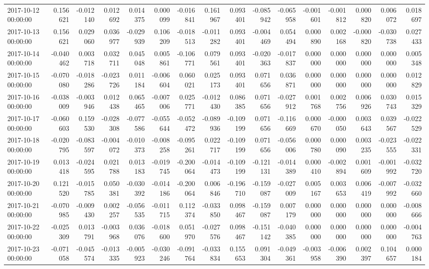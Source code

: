 \begin{tabular}{lrrrrrrrrrrrrrrr}
2017-10-12 00:00:00 & 0.156621 & -0.012140 & 0.012692 & 0.014375 & 0.000099 & -0.016841 & 0.161967 & 0.093401 & -0.085942 & -0.065958 & -0.001601 & -0.001812 & 0.000820 & 0.006072 & 0.018697 \\
2017-10-13 00:00:00 & 0.156621 & 0.029060 & 0.036977 & -0.029939 & 0.106209 & -0.018513 & -0.011282 & 0.093401 & -0.004469 & 0.054494 & 0.000890 & 0.002168 & -0.000820 & -0.030738 & 0.027433 \\
2017-10-14 00:00:00 & -0.040462 & 0.003718 & 0.032711 & 0.045048 & 0.005861 & -0.106771 & 0.079561 & 0.093401 & -0.020363 & -0.017837 & 0.000000 & 0.000000 & 0.000000 & 0.000000 & 0.005348 \\
2017-10-15 00:00:00 & -0.070080 & -0.018286 & -0.023726 & 0.011184 & -0.006604 & 0.060021 & 0.025173 & 0.093401 & 0.071656 & 0.036871 & 0.000000 & 0.000000 & 0.000000 & 0.000000 & 0.012829 \\
2017-10-16 00:00:00 & -0.038009 & -0.003946 & 0.012438 & 0.065465 & -0.007006 & 0.025771 & -0.012430 & 0.086385 & 0.071656 & -0.027912 & 0.001768 & 0.002756 & 0.006926 & 0.030743 & 0.015329 \\
2017-10-17 00:00:00 & -0.060603 & 0.159530 & -0.028308 & -0.077586 & -0.055644 & -0.052472 & -0.089936 & -0.109199 & 0.071656 & -0.116669 & 0.000670 & -0.000050 & 0.003643 & 0.039567 & -0.022529 \\
2017-10-18 00:00:00 & -0.020795 & -0.083597 & -0.004072 & -0.010373 & -0.008258 & -0.095261 & 0.022717 & -0.109199 & 0.071656 & -0.056006 & 0.000780 & 0.000090 & 0.003235 & -0.023555 & -0.022331 \\
2017-10-19 00:00:00 & 0.013418 & -0.024595 & 0.021788 & 0.013183 & -0.019745 & -0.200064 & -0.014473 & -0.109199 & -0.121131 & -0.014389 & 0.000410 & -0.002894 & 0.001609 & -0.001992 & -0.032720 \\
2017-10-20 00:00:00 & 0.121520 & -0.015785 & 0.050381 & -0.030392 & -0.014186 & -0.200064 & 0.006846 & -0.196710 & -0.159087 & -0.027009 & 0.005167 & 0.003653 & 0.006419 & -0.007992 & -0.032660 \\
2017-10-21 00:00:00 & -0.070985 & -0.009430 & 0.002257 & -0.056535 & -0.011715 & 0.112374 & -0.033850 & 0.098467 & -0.159087 & 0.007179 & 0.000000 & 0.000000 & 0.000000 & 0.000000 & -0.008666 \\
2017-10-22 00:00:00 & -0.025309 & 0.013791 & -0.003968 & 0.036076 & -0.018600 & 0.051970 & -0.027576 & 0.098467 & -0.151142 & -0.040385 & 0.000000 & 0.000000 & 0.000000 & 0.000000 & -0.004763 \\
2017-10-23 00:00:00 & -0.071058 & -0.045574 & -0.013335 & -0.005923 & -0.030246 & -0.091764 & -0.033834 & 0.155653 & 0.091304 & -0.049361 & -0.003958 & -0.006390 & 0.002397 & 0.104657 & 0.000184 \\

\end{tabular}
